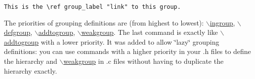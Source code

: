 \footnotesize\begin{verbatim}
This is the \ref group_label "link" to this group.
\end{verbatim}
\normalsize


The priorities of grouping definitions are (from highest to lowest): \hyperlink{commands_cmdingroup}{$\backslash$ingroup}, \hyperlink{commands_cmddefgroup}{$\backslash$defgroup}, \hyperlink{commands_cmdaddtogroup}{$\backslash$addtogroup}, \hyperlink{commands_cmdweakgroup}{$\backslash$weakgroup}. The last command is exactly like \hyperlink{commands_cmdaddtogroup}{$\backslash$addtogroup} with a lower priority. It was added to allow \char`\"{}lazy\char`\"{} grouping definitions: you can use commands with a higher priority in your .h files to define the hierarchy and \hyperlink{commands_cmdweakgroup}{$\backslash$weakgroup} in .c files without having to duplicate the hierarchy exactly.

